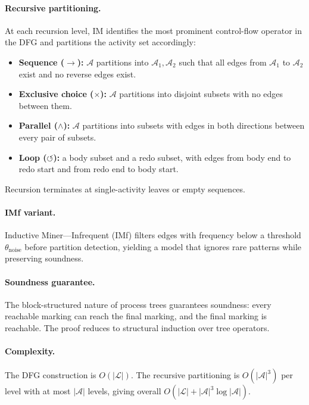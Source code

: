 \paragraph{Recursive partitioning.} At each recursion level, IM identifies
the most prominent control-flow operator in the DFG and partitions the
activity set accordingly:
\begin{itemize}
  \item \textbf{Sequence ($\to$):} $\mathcal{A}$ partitions into
  $\mathcal{A}_1, \mathcal{A}_2$ such that all edges from $\mathcal{A}_1$
  to $\mathcal{A}_2$ exist and no reverse edges exist.
  \item \textbf{Exclusive choice ($\times$):} $\mathcal{A}$ partitions
  into disjoint subsets with no edges between them.
  \item \textbf{Parallel ($\wedge$):} $\mathcal{A}$ partitions into
  subsets with edges in both directions between every pair of subsets.
  \item \textbf{Loop ($\circlearrowleft$):} a body subset and a
  redo subset, with edges from body end to redo start and from redo end
  to body start.
\end{itemize}
Recursion terminates at single-activity leaves or empty sequences.

\paragraph{IMf variant.} Inductive Miner—Infrequent (IMf) filters edges
with frequency below a threshold $\theta_{\text{noise}}$ before partition
detection, yielding a model that ignores rare patterns while preserving
soundness.

\paragraph{Soundness guarantee.} The block-structured nature of process
trees guarantees soundness: every reachable marking can reach the final
marking, and the final marking is reachable. The proof reduces to
structural induction over tree operators.

\paragraph{Complexity.} The DFG construction is $O(|\mathcal{L}|)$. The
recursive partitioning is $O(|\mathcal{A}|^3)$ per level with at most
$|\mathcal{A}|$ levels, giving overall $O(|\mathcal{L}| +
|\mathcal{A}|^3 \log |\mathcal{A}|)$.


